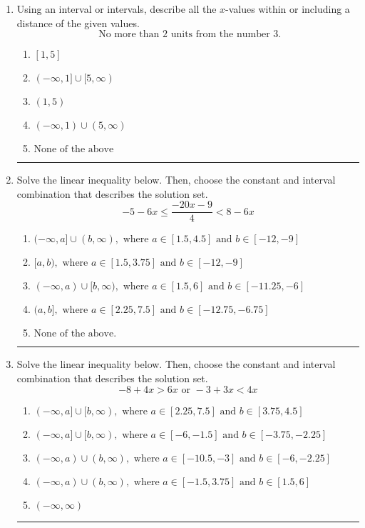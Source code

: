 \documentclass[14pt]{extbook}
\newcommand{\litem}[1]{\item#1\hspace*{-1cm}\rule{\textwidth}{0.4pt}}
\begin{document}
\begin{enumerate}
{\begin{enumerate}[label=\Alph*.]
\end{enumerate} }
\litem{
Using an interval or intervals, describe all the $x$-values within or including a distance of the given values.\[ \text{ No more than } 2 \text{ units from the number } 3. \]\begin{enumerate}[label=\Alph*.]
\item \( [1, 5] \)
\item \( (-\infty, 1] \cup [5, \infty) \)
\item \( (1, 5) \)
\item \( (-\infty, 1) \cup (5, \infty) \)
\item \( \text{None of the above} \)

\end{enumerate} }
\litem{
Solve the linear inequality below. Then, choose the constant and interval combination that describes the solution set.\[ -5 - 6 x \leq \frac{-20 x - 9}{4} < 8 - 6 x \]\begin{enumerate}[label=\Alph*.]
\item \( (-\infty, a] \cup (b, \infty), \text{ where } a \in [1.5, 4.5] \text{ and } b \in [-12, -9] \)
\item \( [a, b), \text{ where } a \in [1.5, 3.75] \text{ and } b \in [-12, -9] \)
\item \( (-\infty, a) \cup [b, \infty), \text{ where } a \in [1.5, 6] \text{ and } b \in [-11.25, -6] \)
\item \( (a, b], \text{ where } a \in [2.25, 7.5] \text{ and } b \in [-12.75, -6.75] \)
\item \( \text{None of the above.} \)

\end{enumerate} }
\litem{
Solve the linear inequality below. Then, choose the constant and interval combination that describes the solution set.\[ -8 + 4 x > 6 x \text{ or } -3 + 3 x < 4 x \]\begin{enumerate}[label=\Alph*.]
\item \( (-\infty, a] \cup [b, \infty), \text{ where } a \in [2.25, 7.5] \text{ and } b \in [3.75, 4.5] \)
\item \( (-\infty, a] \cup [b, \infty), \text{ where } a \in [-6, -1.5] \text{ and } b \in [-3.75, -2.25] \)
\item \( (-\infty, a) \cup (b, \infty), \text{ where } a \in [-10.5, -3] \text{ and } b \in [-6, -2.25] \)
\item \( (-\infty, a) \cup (b, \infty), \text{ where } a \in [-1.5, 3.75] \text{ and } b \in [1.5, 6] \)
\item \( (-\infty, \infty) \)


\end{enumerate}}
\end{enumerate}
\end{document}
